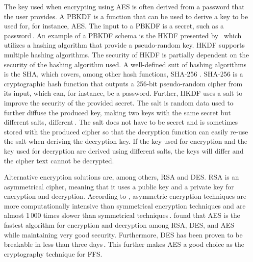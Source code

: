 The key used when encrypting using \gls{AES} is often derived from a password that the user provides. A \gls{PBKDF} is a function that can be used to derive a key to be used for, for instance, \gls{AES}. The input to a \gls{PBKDF} is a secret, such as a password\,\cite{kodwaniSecurityKeyDerivation2021}. An example of a \gls{PBKDF} schema is the \gls{HKDF} presented by \citeauthor{krawczykCryptographicExtractionKey2010}\,\cite{krawczykCryptographicExtractionKey2010, krawczykHMACbasedExtractandExpandKey2010} which utilizes a hashing algorithm that provide a \mbox{pseudo-random} key. \gls{HKDF} supports multiple hashing algorithms. The security of \gls{HKDF} is partially dependent on the security of the hashing algorithm used. A \mbox{well-defined} suit of hashing algorithms is the \gls{SHA}, which covers, among other hash functions, \gls{SHA}-256 \cite{hansenUSSecureHash2011}. \gls{SHA}-256 is a cryptographic hash function that outputs a \mbox{256-bit} \mbox{pseudo-random} cipher from its input, which can, for instance, be a password. Further, \gls{HKDF} uses a salt to improve the security of the provided secret. The salt is random data used to further diffuse the produced key, making two keys with the same secret but different salts, different\,\cite{ariasAddingSaltHashing2021}. The salt does not have to be secret and is sometimes stored with the produced cipher so that the decryption function can easily \mbox{re-use} the salt when deriving the decryption key. If the key used for encryption and the key used for decryption are derived using different salts, the keys will differ and the cipher text cannot be decrypted.

Alternative encryption solutions are, among others, \gls{RSA} and \gls{DES}. \gls{RSA} is an asymmetrical cipher, meaning that it uses a public key and a private key for encryption and decryption. According to \citeauthor{mahajanStudyEncryptionAlgorithms2013}, asymmetric encryption techniques are more computationally intensive than symmetrical encryption techniques and are almost 1\,000 times slower than symmetrical techniques\,\cite{mahajanStudyEncryptionAlgorithms2013}. \citeauthor{mahajanStudyEncryptionAlgorithms2013} found that \gls{AES} is the fastest algorithm for encryption and decryption among \gls{RSA}, \gls{DES}, and \gls{AES} while maintaining very good security. Furthermore, \gls{DES} has been proven to be breakable in less than three days\,\cite{electronicfrontierfoundationEFFCrackerMachine2016}. This further makes \gls{AES} a good choice as the cryptography technique for \gls{FFS}.